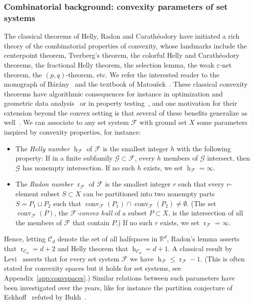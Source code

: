 \documentclass[11pt]{article}
\newcommand{\R}{\mathbb{R}}
\newcommand{\C}{\mathcal{C}}
\newcommand{\F}{\mathcal{F}}
\newcommand{\G}{\mathcal{G}}
\DeclareMathOperator{\h}{h}
\DeclareMathOperator{\conv}{conv}
\DeclareMathOperator{\rad}{r}
\newcommand{\defn}[1]{\emph{\color{violet}#1}}
\begin{document}
\subsubsection{Combinatorial background: convexity parameters of set systems}\label{s:cbk}
%
The classical theorems of Helly, Radon and Carathéodory have initiated a rich theory of the combinatorial properties of convexity, whose landmarks include the centerpoint theorem, Tverberg's theorem, the colorful Helly and Carathéodory theorems, the fractional Helly theorem, the selection lemma, the weak $\varepsilon$-net theorem, the $(p,q)$-theorem, etc. We refer the interested reader to the monograph of Bárány~\cite{barany2021combinatorial} and the textbook of Matou\v{s}ek~\cite{matousek2013lectures}. These classical convexity theorems have algorithmic consequences for instance in optimization and geometric data analysis~\cite[$\mathsection~6-7$]{de2019discrete} or in property testing~\cite{chakraborty2018helly}, and one motivation for their extension beyond the convex setting is that several of these benefits generalize as well~\cite{msw-sblp-92,epstein_et_al:LIPIcs.ICALP.2020.98}.
%
\medskip
%
We can associate to any set system $\F$ with ground set $X$ some parameters inspired by convexity properties, for instance:
%
\begin{itemize}
\item The \defn{Helly number} $\h_\F$ of $\F$ is the smallest integer $h$ with the following property: If in a finite subfamily $\G \subset\F$, every $h$ members of $\G$ intersect, then $\G$ has nonempty intersection. If no such $h$ exists, we set $\h_\F=\infty$.\medskip
%
\item The \defn{Radon number} $\rad_\F$ of $\F$ is the smallest integer $r$ such that every $r$-element subset $S\subset X$ can be partitioned into two nonempty parts $S=P_1\sqcup P_2$ such that $\conv_{\F}(P_1) \cap \conv_{\F}(P_2) \neq \emptyset$. (The set $\conv_{\F}(P)$, the \emph{$\F$-convex hull} of a subset $P\subset X$, is the intersection of all the members of $\F$ that contain $P$.) If no such $r$ exists, we set $\rad_\F=\infty$.
\end{itemize}
%
\noindent
Hence, letting $\C_d$ denote the set of all halfspaces in $\R^d$, Radon's lemma asserts that $\rad_{\C_d} = d+2$ and Helly theorem that $\h_{\C_d} = d+1$. A classical result by Levi~\cite{Levi_radon_implies_helly} asserts that for every set system $\F$ we have $\h_{\F} \leq \rad_\F-1$. (This is often stated for convexity spaces but it holds for set systems, see Appendix~\ref{app:convspaces}.) Similar relations between such parameters have been investigated over the years, like for instance the partition conjecture of Eckhoff~\cite{ECKHOFF200061} refuted by Bukh~\cite{bukh2010radon}.
\end{document}
